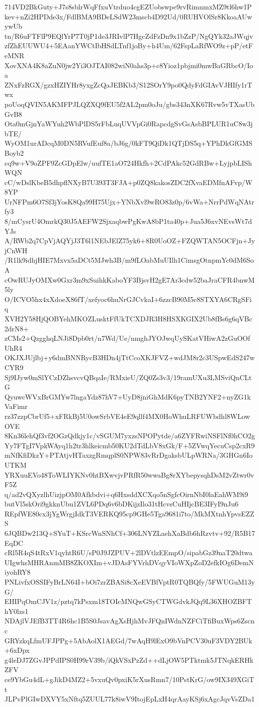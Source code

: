 714VD2BkGuty+J7s8sblrWqFfxuVtrduo4cgEZUobswpe9rvRimnmxMZ9tl6hw1P
kev+nZi2HPDde3x/FdlBMA9BDeLSdW23mscb4D92Ud/0RUHVOlSr8KkoaAUwywUb
tn/R6uFTFlP9EQlYrP7T0jP1de3JRIvlP7HgcZdFzDn9x1bZzP/NgQYk32aJWqjv
zfZhEUUWU4+5EAanYWCtIbHSdLTnf1joBy+h4Um/62FspLaRfWO9z+pP/etFeMNR
XovXNA4K8aZuN0jw2Yi3OJTAI082wiN0ahs3p+c8Yioz1pbjmi0mwBaGRbcO/Ioa
ZNxFzRGX/gzxHZIYHr8yxgZcQaJEBKb3/S12SOrY9po0QdyFdGIAvVJHIfy1rTwx
poUoqQVIN5AKMFPJLQZXQ9fEU5f2AL2pm0oJu/gbs343nXK67Rvw5vTXasUbGvB8
Ota0mGjnYaWYuh2WbPlDS5rFbLuqUVVpGi0RapcdgSvGsAsbBPLUR1uC8w3jbTE/
WyOM1urADcqM0DN5RVufEuf8a/bJ6g/0kFT9QiDk1QTjDS5q+YPhDkGfGMSBoyb2
cq9w+V9oZPF9ZcGDpElw/uufTE1aO724Hkfh+2CdPAkc52GdRBw+LyjpbLIShWQN
cC/wDslKbeB5dhpflNXyB7U393T3FJA+p0ZQ8kakosZDC2fXvaEDMfnAFvp/W8YP
UrNFPm6O7Sf3jYosK8Qa99H75Ujx+YNbXvl9wRO83z0p/6vWa+NrrPdWqNAtrfy3
8/mCysrU4OmrkQ30J5AEFW2SjxaqbwPgKwA8bP1ta40p+Jua5J6xvNEvsWt7dYJs
A/RWb2q7CpVjAQYjJ3T6l1NEbJElZ75yk6+8R0UoOZ+FZQWTAN5OCFjn+JyjCnWH
/R1lk9idhjHIE7Mxvx5aDCt5MJwh3B/m9fLOabMuUIlh1CimsgOtnpmYc0dM6SoA
cOwRUJyOMXw0Gxr3m9xSuihkKaboYF3BjsvH2gE7Ar3cdw52baJraCFR4bnwM5ly
O/ICVO5hx4xXdoeX86fT/xefyoc6huNrGJCvkaI+6zzcB90M5c8STXYA6CRgSFiq
XVH2Y58HjQOBYehMKOZLusktFfUkTCXDJR3H8HSXKGIX2Ub8fBs6g6qVBc2drN8+
zCMs2+QzgghqLNJi8Dpb0rt/n7Wd/Ue/nmghJYOJwqUySKatVHiwA2zGuOOfUhR4
OKJXJUjlbj+y6dmBNNRycB3HDn4jTtCcoXKJFVZ+wdJM8r2c3USpwEdS247wCYR9
Sj9IJyw0mSlYCzDZhsvcvQBqaIe/RMxieU/ZQ0Zs3v3/19ramUXu3LMSviQnCLtG
QyuwcWVxBrGMYw7lngaYdz87hV7+UyD8jniGhMdK6pyTNB2YNF2+nyZG1kVaFimr
rz37zzpCbrUf5+xFRkBj5U0owSrbVE4eE9qllf4MX0HoWhuLRFUWbdhl8WLowOVE
8Kn36lehQf3vf2OGzQdkjy1c/vSGUM7yxzsNPOPytde/a6ZYFRwiNSFlNf0hCO2g
Yy7FTgI7VpkWAyq1h2tr3hlkeicmb50KU2dTdLbV8xGk/F+5ZVwqYecuCsp2cxR9
mNfKfiDkzY+PTAtjvHTaxzgRmqplS0NPW83vRrDgaksbULpWRNa/3GHGn6IoUTKM
YRXuuEVo48ToWLIYKNv0htBXwvjvPRfR50wwaBg8rXYbepysqhDsM2vZtwr0vF5Z
q/ad2vQXyzlhUizjpOM0Afkbdvi+q6HxsddXCXqo5nSgfcOirnNbI0laEahWM9i9
butVl5skOri9gkknUbu1ZVL6PDq6v6bDKijzIlo31tHcvsCuHIjcBE3IFyI9nJu6
REpfWE80cx3jYgWrgjIdkT3VERKQ95cp9GHe5Tga9681i7to/MkMXtnhYpvsEZZS
6JQBDw213Q+SYuT+KSrcWnSNhCf+306LNYZLaehXaBdb6hRzvtv+92/R5B17EqDC
cRl5R4qS4tRxV1qyhtR6U/sP0J9JZPUV+2lDVtlzEEmpO/sipabGz39naT20dtwa
UIgwhsMHRAnmMB8ZKOXIm+vJDAsFYVrhDVqyVIoWXpZoD2efkIOg6DemNiyohRY8
PNLivfxOSSIFyBrLN64I+bOi7zrZBASi8cXeEVBfVptR0TQBQfy/5FWUGuM13yG/
EHIPqOmCJV1z/pztq7kPsxm18TOIcMNQwGSyCTWGdvkJQq9L36XHOZBFThY0lzs1
NDAjlVJEfB3TT4R6hc1B5S0JsavAgXsHjhMvJFQnIWdnNZFCiTfiBuxWps6Zscnc
GRYzkqLfmUFJPPg+5AbAolX1AEGd/7wAqH9lExO9bVnPCV30uF3VDY2BUk+6xDpx
g4leDJ7ZGvJPPdIPS0H99rV39b/iQkVSxPzZd++dLjOW5PTktmk5JTNqkERHkZFV
ce9YbGu4dL+gJikD4MZ2+5vxuQv0pxiK5rXusRmn7/10PstKrG/ow9IX349XGiTt
JLPvPlGIwDXVY5xNftq5ZUUL77k8iwV9ItojEpLxH4qrAayKSj6xAgcJqvVsZDa1
